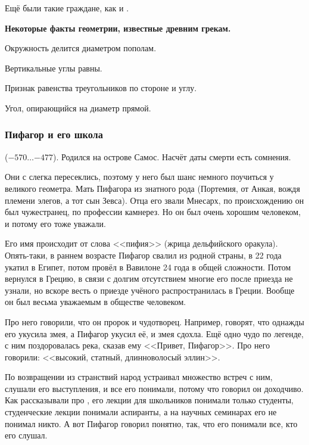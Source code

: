\documentclass[a4paper,oneside,fleqn,10pt]{article}
\newcommand{\pe}[2]{${#1}\ldots{#2}$}
\begin{document}
Ещё были такие граждане, как  и .

\textbf{Некоторые факты геометрии, известные древним грекам.}

\begin{items}{-2}
\item Окружность делится диаметром пополам.
\item Вертикальные углы равны.
\item Признак равенства треугольников по стороне и углу.
\item Угол, опирающийся на диаметр прямой.
\end{items}

\subsubsection{Пифагор и его школа}

 (\pe{-570}{-477}). Родился на острове Самос.
Насчёт даты смерти есть сомнения.

Они с  слегка пересеклись, поэтому у него был
шанс немного поучиться у великого геометра.  Мать Пифагора из знатного
рода (Портемия, от Анкая, вождя племени элегов, а тот сын Зевса).
Отца его звали Мнесарх, по происхождению он был чужестранец, по
профессии камнерез.  Но он был очень хорошим человеком, и потому его
тоже уважали.

Его имя происходит от слова <<пифия>> (жрица дельфийского
оракула). Опять-таки, в раннем возрасте Пифагор свалил из родной
страны, в 22 года укатил в Египет, потом провёл в Вавилоне 24 года в
общей сложности. Потом вернулся в Грецию, в связи с долгим отсутствием
многие его после приезда не узнали, но вскоре весть о приезде учёного
распространилась в Греции. Вообще он был весьма уважаемым в обществе
человеком.

Про него говорили, что он пророк и чудотворец. Например, говорят, что
однажды его укусила змея, а Пифагор укусил её, и змея сдохла.  Ещё
одно чудо по легенде, с ним поздоровалась река, сказав ему <<Привет,
Пифагор>>.  Про него говорили: <<высокий, статный, длинноволосый
эллин>>.

По возвращении из странствий народ устраивал множество встреч с ним,
слушали его выступления, и все его понимали, потому что говорил он
доходчиво.  Как рассказывали про , его
лекции для школьников понимали только студенты, студенческие лекции
понимали аспиранты, а на научных семинарах его не понимал никто.  А
вот Пифагор говорил понятно, так, что его понимали все, кто его
слушал.
\end{document}
